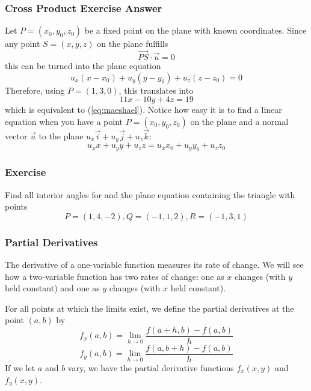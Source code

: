 \documentclass[xcolor=dvipsnames]{beamer}
\begin{document}
\begin{frame}
  \frametitle{Cross Product Exercise Answer}
  Let $P=(x_{0},y_{0},z_{0})$ be a fixed point on the plane with known
  coordinates. Since any point $S=(x,y,z)$ on the plane fulfills
\begin{equation}
  \label{eq:iefeeboh}
  \vec{PS}\cdot\vec{u}=0
\end{equation}
this can be turned into the plane equation
\begin{equation}
  \label{eq:vetiexup}
  u_{x}(x-x_{0})+u_{y}(y-y_{0})+u_{z}(z-z_{0})=0
\end{equation}
Therefore, using $P=(1,3,0)$, this translates into
\begin{equation}
  \label{eq:eechawoi}
11x-10y+4z=19  
\end{equation}
which is equivalent to (\ref{eq:maeshael}). Notice how easy it is to
find a linear equation when you have a point $P=(x_{0},y_{0},z_{0})$
on the plane and a normal vector $\vec{u}$ to the plane
$u_{x}\vec{i}+u_{y}\vec{j}+u_{z}\vec{k}$:
\begin{equation}
  \label{eq:quaghoob}
u_{x}x+u_{y}y+u_{z}z=u_{x}x_{0}+u_{y}y_{0}+u_{z}z_{0}
\end{equation}
\end{frame}

\begin{frame}
  \frametitle{Exercise}
  {\ubung} Find all interior angles for and the plane equation
  containing the triangle with points
  \begin{equation}
    \label{eq:yeibieba}
    P=(1,4,-2),Q=(-1,1,2),R=(-1,3,1)
  \end{equation}
\end{frame}

\begin{frame}
  \frametitle{Partial Derivatives}
  The derivative of a one-variable function measures its rate of
  change. We will see how a two-variable function has two rates of
  change: one as $x$ changes (with $y$ held constant) and one as $y$ changes
  (with $x$ held constant).

  \bigskip

  For all points at which the limits exist, we define the
  \alert{partial derivatives} at the point $(a,b)$ by
  \begin{equation}
    \label{eq:deeghazi}
    f_{x}(a,b)=\lim_{h\rightarrow{}0}\frac{f(a+h,b)-f(a,b)}{h}
  \end{equation}
  \begin{equation}
    \label{eq:aevoonei}
    f_{y}(a,b)=\lim_{h\rightarrow{}0}\frac{f(a,b+h)-f(a,b)}{h}
  \end{equation}
If we let $a$ and $b$ vary, we have the \alert{partial derivative
  functions} $f_{x}(x,y)$ and $f_{y}(x,y)$. 
\end{frame}
\end{document}
